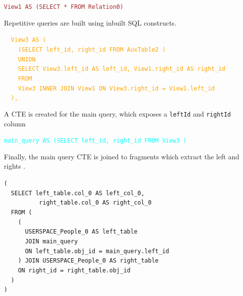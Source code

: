 \documentclass[12pt,a4paper,twoside,openright]{report}
\newcommand\codeName[1]{\texttt{#1}}
\begin{document}
\begin{framed}
\textcolor{brown}{
\texttt{View1 AS (SELECT * FROM Relation0)}
}
\end{framed}

Repetitive queries are built using inbuilt SQL constructs.
\begin{framed}
\noindent
\textcolor{orange}{
\mbox{\texttt{~~View3 AS (}}\\
\mbox{\texttt{~~~~(SELECT left_id, right_id FROM AuxTable2 )}}\\
\mbox{\texttt{~~~~UNION}}\\
\mbox{\texttt{~~~~SELECT View3.left_id AS left_id, View1.right_id AS right_id}}\\
\mbox{\texttt{~~~~FROM}}\\
\mbox{\texttt{~~~~View3 INNER JOIN View1 ON View3.right_id = View1.left_id}}\\
\mbox{\texttt{~~),}}\\
}
\end{framed}

A CTE is created for the main query, which exposes a \codeName{leftId} and \codeName{rightId}  column

\begin{framed}
\textcolor{cyan}{
\texttt{main_query AS (SELECT left_id, right_id FROM View3 )}
}
\end{framed}

Finally, the main query CTE is joined to fragments which extract the left and rights .
\begin{framed}
\noindent
\mbox{\texttt{(}}\\
\mbox{\texttt{~~SELECT left_table.col_0 AS left_col_0,}}\\
\mbox{\texttt{~~~~~~~~~~right_table.col_0 AS right_col_0}}\\
\mbox{\texttt{~~FROM (}}\\
\mbox{\texttt{~~~~(}}\\
\mbox{\texttt{~~~~~~USERSPACE_People_0 AS left_table}}\\
\mbox{\texttt{~~~~~~JOIN main_query}}\\
\mbox{\texttt{~~~~~~ON left_table.obj_id = main_query.left_id}}\\
\mbox{\texttt{~~~~) JOIN USERSPACE_People_0 AS right_table}}\\
\mbox{\texttt{~~~~ON right_id = right_table.obj_id}}\\
\mbox{\texttt{~~)}}\\
\mbox{\texttt{)}}\\\end{framed}
\end{document}
